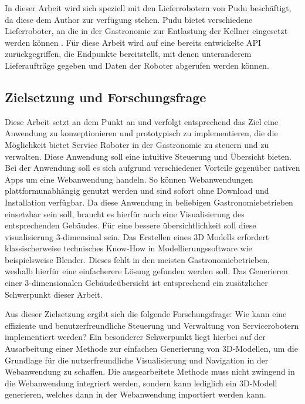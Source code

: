 In dieser Arbeit wird sich speziell mit den Lieferrobotern von Pudu beschäftigt, da diese dem Author zur verfügung stehen. Pudu bietet verschiedene Lieferroboter, an die in der Gastronomie zur Entlastung der Kellner eingesetzt werden können \cite{PUDU2024}. Für diese Arbeit wird auf eine bereits entwickelte API zurückgegriffen, die Endpunkte bereitstellt, mit denen unteranderem Lieferaufträge gegeben und Daten der Roboter abgerufen werden können.


\subsection{Zielsetzung und Forschungsfrage}
Diese Arbeit setzt an dem Punkt an und verfolgt entsprechend das Ziel eine Anwendung zu konzeptionieren und prototypisch zu implementieren, die die Möglichkeit bietet Service Roboter in der Gastronomie zu steuern und zu verwalten. Diese Anwendung soll eine intuitive Steuerung und Übersicht bieten. Bei der Anwendung soll es sich aufgrund verschiedener Vorteile gegenüber nativen Apps um eine Webanwendung handeln. So können Webanwendungen plattformunabhängig genutzt werden und sind sofort ohne Download und Installation verfügbar. Da diese Anwendung in beliebigen Gastronomiebetrieben einsetzbar sein soll, braucht es hierfür auch eine Visualisierung des entsprechenden Gebäudes. Für eine bessere übersichtlichkeit soll diese visualisierung 3-dimensinal sein. Das Erstellen eines 3D Modells erfordert klassischerweise technisches Know-How in Modellierungssoftware wie beispielsweise Blender. Dieses fehlt in den meisten Gastronomiebetrieben, weshalb hierfür eine einfacherere Lösung gefunden werden soll. Das Generieren einer 3-dimensionalen Gebäudeübersicht ist entsprechend ein zusätzlicher Schwerpunkt dieser Arbeit.

Aus dieser Zielsetzung ergibt sich die folgende Forschungsfrage: Wie kann eine effiziente und benutzerfreundliche Steuerung und Verwaltung von Servicerobotern implementiert werden? Ein besonderer Schwerpunkt liegt hierbei auf der Ausarbeitung einer Methode zur einfachen Generierung von 3D-Modellen, um die Grundlage für die nutzerfreundliche Visualisierung und Navigation in der Webanwendung zu schaffen. Die ausgearbeitete Methode muss nicht zwingend in die Webanwendung integriert werden, sondern kann lediglich ein 3D-Modell generieren, welches dann in der Webanwendung importiert werden kann.


